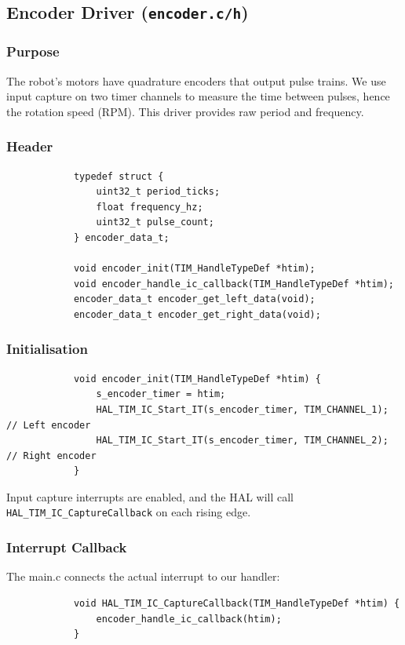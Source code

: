 \documentclass[12pt,a4paper]{article}
\begin{document}
		\subsection{Encoder Driver (\texttt{encoder.c/h})}
		\subsubsection{Purpose}
		The robot’s motors have quadrature encoders that output pulse trains. We use input capture on two timer channels to measure the time between pulses, hence the rotation speed (RPM). This driver provides raw period and frequency.
		
		\subsubsection{Header}
		\begin{lstlisting}
			typedef struct {
				uint32_t period_ticks;
				float frequency_hz;
				uint32_t pulse_count;
			} encoder_data_t;
			
			void encoder_init(TIM_HandleTypeDef *htim);
			void encoder_handle_ic_callback(TIM_HandleTypeDef *htim);
			encoder_data_t encoder_get_left_data(void);
			encoder_data_t encoder_get_right_data(void);
		\end{lstlisting}
		
		\subsubsection{Initialisation}
		\begin{lstlisting}
			void encoder_init(TIM_HandleTypeDef *htim) {
				s_encoder_timer = htim;
				HAL_TIM_IC_Start_IT(s_encoder_timer, TIM_CHANNEL_1); // Left encoder
				HAL_TIM_IC_Start_IT(s_encoder_timer, TIM_CHANNEL_2); // Right encoder
			}
		\end{lstlisting}
		Input capture interrupts are enabled, and the HAL will call \texttt{HAL\_TIM\_IC\_CaptureCallback} on each rising edge.
		
		\subsubsection{Interrupt Callback}
		The main.c connects the actual interrupt to our handler:
		\begin{lstlisting}
			void HAL_TIM_IC_CaptureCallback(TIM_HandleTypeDef *htim) {
				encoder_handle_ic_callback(htim);
			}
		\end{lstlisting}
		
\end{document}
